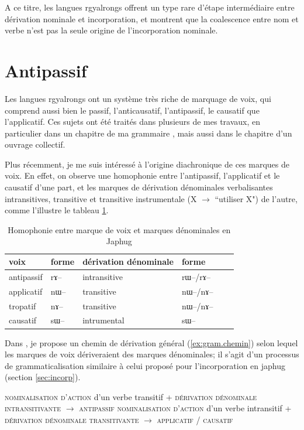 \documentclass[oldfontcommands,oneside,a4paper,11pt]{memoir}
\newcommand{\ipa}[1]{{\phon #1}} %
\begin{document}
A ce titre, les langues rgyalrongs offrent un type rare d'étape intermédiaire entre dérivation nominale et incorporation, et montrent que la coalescence entre nom et verbe n'est pas la seule origine de l'incorporation nominale.

\section{Antipassif}

Les langues rgyalrongs ont un système très riche de marquage de voix, qui comprend aussi bien le passif, l'anticausatif, l'antipassif, le causatif que l'applicatif. Ces sujets ont été traités dans plusieurs de mes travaux, en particulier dans un chapitre de ma grammaire \citet{jacques08zh}, mais aussi dans le chapitre \citet{jacques12demotion} d'un ouvrage collectif. 


Plus récemment, je me suis intéressé à l'origine diachronique de ces marques de voix. En effet, on observe une homophonie entre l'antipassif, l'applicatif et le causatif d'une part, et les marques de dérivation dénominales verbalisantes intransitives, transitive et transitive instrumentale (X $\rightarrow$ ``utiliser X") de l'autre, comme l'illustre le tableau \ref{tab:homophonie}.


\begin{table}[H]
\caption{Homophonie entre marque de voix et marques dénominales en Japhug } \label{tab:homophonie} \centering
\begin{tabular}{llllll}
\toprule
voix& forme&dérivation dénominale& forme \\
\midrule
  antipassif&\ipa{rɤ}--&intransitive&\ipa{rɯ}--/\ipa{rɤ}--   \\
 applicatif&\ipa{nɯ}--&transitive&\ipa{nɯ}--/\ipa{nɤ}--   \\
 tropatif&\ipa{nɤ}--&transitive&\ipa{nɯ}--/\ipa{nɤ}--   \\
 causatif&\ipa{sɯ}--&intrumental&\ipa{sɯ}--    \\
\bottomrule
\end{tabular}
\end{table}

Dans \citet{jacques14antipassive}, je propose un chemin de dérivation général (\ref{ex:gram.chemin}) selon lequel les marques de voix dériveraient des marques dénominales; il s'agit d'un processus de grammaticalisation similaire à celui proposé pour l'incorporation en japhug (section \ref{sec:incorp}).


\begin{exe}
\ex \label{ex:gram.chemin}
\glt \textsc{nominalisation d'action} d'un verbe transitif + \textsc{dérivation dénominale intransitivante} $\rightarrow$ \textsc{antipassif}
\glt \textsc{nominalisation d'action} d'un verbe intransitif  + \textsc{dérivation dénominale  transitivante} $\rightarrow$ \textsc{applicatif} / \textsc{causatif}
\end{exe}
\end{document}
